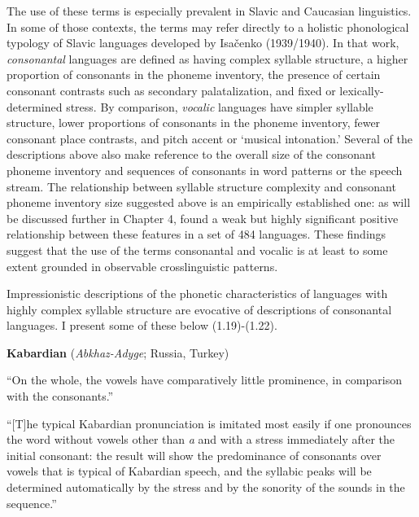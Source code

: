   The use of these terms is especially prevalent in Slavic and Caucasian linguistics. In some of those contexts, the terms may refer directly to a holistic phonological typology of Slavic languages developed by Isačenko (1939/1940). In that work, \textit{consonantal} languages are defined as having complex syllable structure, a higher proportion of consonants in the phoneme inventory, the presence of certain consonant contrasts such as secondary palatalization, and fixed or lexically-determined stress. By comparison, \textit{vocalic} languages have simpler syllable structure, lower proportions of consonants in the phoneme inventory, fewer consonant place contrasts, and pitch accent or ‘musical intonation.’ Several of the descriptions above also make reference to the overall size of the consonant phoneme inventory and sequences of consonants in word patterns or the speech stream. The relationship between syllable structure complexity and consonant phoneme inventory size suggested above is an empirically established one: as will be discussed further in Chapter 4, \citet{Maddieson2013a} found a weak but highly significant positive relationship between these features in a set of 484 languages. These findings suggest that the use of the terms consonantal and vocalic is at least to some extent grounded in observable crosslinguistic patterns.



  Impressionistic descriptions of the phonetic characteristics of languages with highly complex syllable structure are evocative of descriptions of consonantal languages. I present some of these below (1.19)-(1.22).



\ea\label{ex:(1.19)}
  \textbf{Kabardian} (\textit{Abkhaz-Adyge}; Russia, Turkey)



“On the whole, the vowels have comparatively little prominence, in comparison with the consonants.”



\citep[24]{Kuipers1960}



“[T]he typical Kabardian pronunciation is imitated most easily if one pronounces the word without vowels other than \textit{a} and with a stress immediately after the initial consonant: the result will show the predominance of consonants over vowels that is typical of Kabardian speech, and the syllabic peaks will be determined automatically by the stress and by the sonority of the sounds in the sequence.” 



